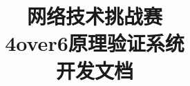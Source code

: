 \documentclass[hyperpdf,bindnopdf]{hepthesis}
\title{网络技术挑战赛\\4over6原理验证系统\\开发文档}
\author{ }
\begin{document}
\begin{frontmatter}
  
\end{frontmatter}

\begin{mainmatter}
  
  
  
   
  
    
  
\end{mainmatter}

%  

%  

\end{document}

